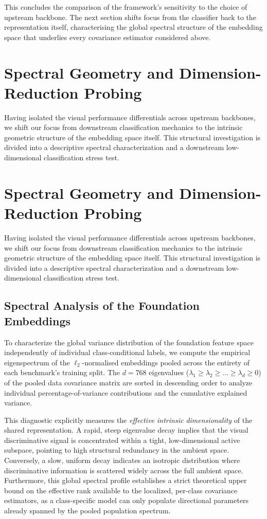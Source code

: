 This concludes the comparison of the framework's sensitivity to the choice of upstream backbone. The next section shifts focus from the classifier back to the representation itself, characterising the global spectral structure of the embedding space that underlies every covariance estimator considered above.

\section{Spectral Geometry and Dimension-Reduction Probing}
\label{sec:method:spectral_pca}

Having isolated the visual performance differentials across upstream backbones, we shift our focus from downstream classification mechanics to the intrinsic geometric structure of the embedding space itself. This structural investigation is divided into a descriptive spectral characterization and a downstream low-dimensional classification stress test.

\section{Spectral Geometry and Dimension-Reduction Probing}
\label{sec:method:spectral_pca}

Having isolated the visual performance differentials across upstream backbones, we shift our focus from downstream classification mechanics to the intrinsic geometric structure of the embedding space itself. This structural investigation is divided into a descriptive spectral characterization and a downstream low-dimensional classification stress test.

\subsection{Spectral Analysis of the Foundation Embeddings}
\label{sec:method:spectral:analysis}

To characterize the global variance distribution of the foundation feature space independently of individual class-conditional labels, we compute the empirical eigenspectrum of the $\ell_2$-normalised embeddings pooled across the entirety of each benchmark's training split. The $d=768$ eigenvalues ($\lambda_1 \ge \lambda_2 \ge \dots \ge \lambda_d \ge 0$) of the pooled data covariance matrix are sorted in descending order to analyze individual percentage-of-variance contributions and the cumulative explained variance.

This diagnostic explicitly measures the \emph{effective intrinsic dimensionality} of the shared representation. A rapid, steep eigenvalue decay implies that the visual discriminative signal is concentrated within a tight, low-dimensional active subspace, pointing to high structural redundancy in the ambient space. Conversely, a slow, uniform decay indicates an isotropic distribution where discriminative information is scattered widely across the full ambient space. Furthermore, this global spectral profile establishes a strict theoretical upper bound on the effective rank available to the localized, per-class covariance estimators, as a class-specific model can only populate directional parameters already spanned by the pooled population spectrum.

